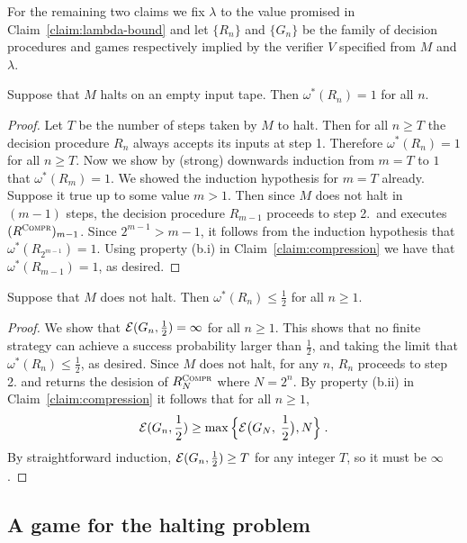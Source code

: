 For the remaining two claims we fix $\lambda$ to the value promised in Claim~\ref{claim:lambda-bound} and let $\{R_n\}$ and $\{G_n\}$ be the family of decision procedures and games respectively implied by the verifier $V$ specified from $M$ and $\lambda$. 

\begin{claim}\label{claim:m-halt-1}
Suppose that $M$ halts on an empty input tape. Then $\omega^*(R_n) = 1$ for all $n$. 
\end{claim}

\begin{proof}
Let $T$ be the number of steps taken by $M$ to halt. Then for all $n\geq T$ the decision procedure $R_n$ always accepts its inputs at step 1. Therefore $\omega^*(R_n)=1$ for all $n\geq T$. Now we show by (strong) downwards induction from $m=T$ to $1$ that $\omega^*(R_m)=1$. We showed the induction hypothesis for $m=T$ already. Suppose it true up to some value $m>1$. Then since $M$ does not halt in $(m-1)$ steps, the decision procedure $R_{m-1}$ proceeds to step 2.\ and executes $(R^{\textsc{Compr}})_{m-1}$. Since $2^{m-1} > m-1$, it follows from the induction hypothesis that $\omega^*(R_{2^{m-1}})=1$. Using property (b.i) in Claim~\ref{claim:compression} we have that $\omega^*(R_{{m-1}})=1$, as desired. 
\end{proof}

\begin{claim}\label{claim:m-halt-2}
Suppose that $M$ does not halt. Then $\omega^*(R_n)\leq \frac{1}{2}$ for all $n\geq 1$. 
\end{claim}

\begin{proof}
We show that $\mathcal{E}(G_n,\frac{1}{2})=\infty$ for all $n\geq 1$. This shows that no finite strategy can achieve a success probability larger than $\frac{1}{2}$, and taking the limit that $\omega^*(R_n)\leq \frac{1}{2}$, as desired. Since $M$ does not halt, for any $n$, $R_n$ proceeds to step 2. and returns the desision of $R^{\textsc{Compr}}_N$ where $N=2^n$. By property (b.ii) in Claim~\ref{claim:compression} it follows that for all $n\geq 1$,
\[ \mathcal{E}(G_n,\frac{1}{2}) \geq \max\Big\{\mathcal{E}\big(G_N,\;\frac{1}{2}\big),N\Big\}\;.\]
By straightforward induction, $\mathcal{E}(G_n,\frac{1}{2}) \geq T$ for any integer $T$, so it must be $\infty$. 
\end{proof}


\subsection{A game for the halting problem}

